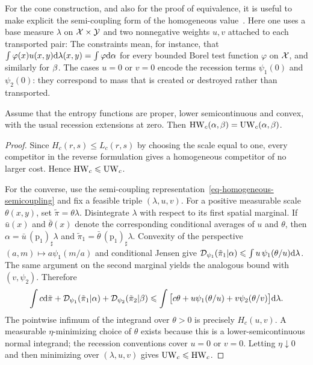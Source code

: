 For the cone construction, and also for the proof of equivalence, it is useful to make explicit the semi-coupling form of the homogeneous value~\cite{LieroMielkeSavareLong}. Here one uses a base measure $\lambda$ on $\mathcal{X}\times\mathcal{Y}$ and two nonnegative weights $u,v$ attached to each transported pair:
The constraints mean, for instance, that
$\int \varphi(x)u(x,y)\mathrm{d}\lambda(x,y)=\int\varphi\mathrm{d}\alpha$ for every bounded Borel
test function $\varphi$ on $\mathcal{X}$, and similarly for $\beta$. The cases $u=0$ or
$v=0$ encode the recession terms $\psi_1(0)$ and $\psi_2(0)$: they correspond
to mass that is created or destroyed rather than transported.

\begin{prop}\label{prop-homogeneous-unbalanced}
	Assume that the entropy functions are proper, lower semicontinuous and convex, with the usual recession extensions at zero. Then
	$\operatorname{HW}_c(\alpha,\beta)=\operatorname{UW}_c(\alpha,\beta)$.
\end{prop}

\begin{proof}
	Since $H_c(r,s)\leq L_c(r,s)$ by choosing the scale equal to one, every competitor in the reverse formulation gives a homogeneous competitor of no larger cost. Hence $\operatorname{HW}_c\leqslant\operatorname{UW}_c$.

	For the converse, use the semi-coupling representation~\eqref{eq-homogeneous-semicoupling} and fix a feasible triple $(\lambda,u,v)$. For a positive measurable scale $\theta(x,y)$, set $\tilde\pi=\theta\lambda$. Disintegrate $\lambda$ with respect to its first spatial marginal. If $\bar u(x)$ and $\bar\theta(x)$ denote the corresponding conditional averages of $u$ and $\theta$, then $\alpha=\bar u\,(\mathrm p_1)_\sharp\lambda$ and $\tilde\pi_1=\bar\theta\,(\mathrm p_1)_\sharp\lambda$. Convexity of the perspective $(a,m)\mapsto a\psi_1(m/a)$ and conditional Jensen give
	$\mathcal{D}_{\psi_1}(\tilde\pi_1|\alpha) \leqslant \int u\,\psi_1(\theta/u)\mathrm{d}\lambda$.
	The same argument on the second marginal yields the analogous bound with $(v,\psi_2)$. Therefore
	\[
		\int c\mathrm{d}\tilde\pi
		+\mathcal{D}_{\psi_1}(\tilde\pi_1|\alpha)
		+\mathcal{D}_{\psi_2}(\tilde\pi_2|\beta)
		\leqslant
		\int\big[c\theta+u\psi_1(\theta/u)+v\psi_2(\theta/v)\big]\mathrm{d}\lambda.
	\]
	The pointwise infimum of the integrand over $\theta>0$ is precisely $H_c(u,v)$. A measurable $\eta$-minimizing choice of $\theta$ exists because this is a lower-semicontinuous normal integrand; the recession conventions cover $u=0$ or $v=0$. Letting $\eta\downarrow0$ and then minimizing over $(\lambda,u,v)$ gives $\operatorname{UW}_c\leqslant\operatorname{HW}_c$.
\end{proof}

